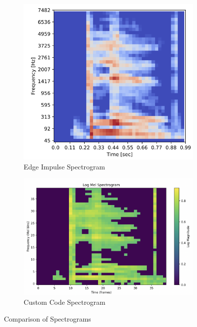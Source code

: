 \begin{figure}[!h]
    \centering
    \begin{subfigure}[t]{0.4\textwidth}
        \centering
        \includegraphics[width=\textwidth]{images/4.02 Spectrogram Edge Impulse.png}
        \caption{Edge Impulse Spectrogram}
    \end{subfigure}
    \hfill
    \begin{subfigure}[t]{0.5\textwidth}
        \centering
        \includegraphics[width=\textwidth]{images/4.03 Spectrogram My Code.png}
        \caption{Custom Code Spectrogram}
    \end{subfigure}
    \caption{Comparison of Spectrograms}
\end{figure}

